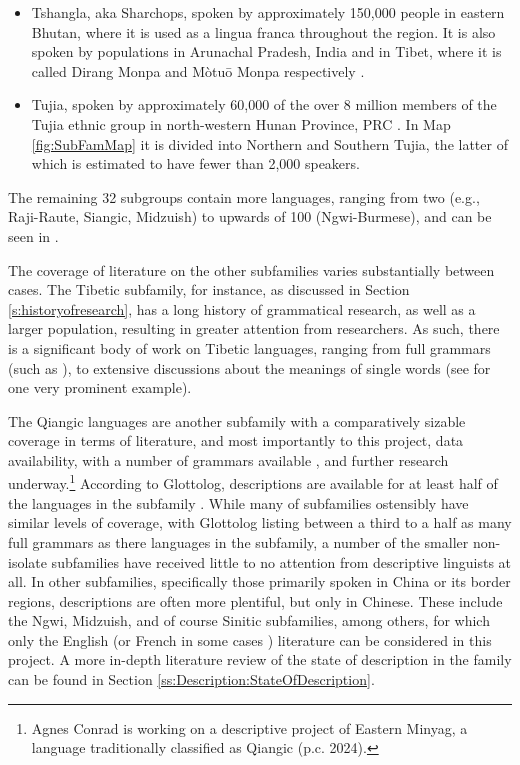 \begin{itemize}
    \item Tshangla, aka Sharchops, spoken by approximately 150,000 people in eastern Bhutan, where it is used as a lingua franca throughout the region. It is also spoken by populations in Arunachal Pradesh, India and in Tibet, where it is called Dirang Monpa and Mòtuō Monpa respectively \cites{Andvik2010}{Grollmann2018}.
    \item Tujia, spoken by approximately 60,000 of the over 8 million members of the Tujia ethnic group in north-western Hunan Province, PRC \cite{Brassett2006}. In Map \ref{fig:SubFamMap} it is divided into Northern and Southern Tujia, the latter of which is estimated to have fewer than 2,000 speakers.
\end{itemize}

The remaining 32 subgroups contain more languages, ranging from two (e.g., Raji-Raute, Siangic, Midzuish) to upwards of 100 (Ngwi-Burmese), and can be seen in .

The coverage of literature on the other subfamilies varies substantially between cases. The Tibetic subfamily, for instance, as discussed in Section \ref{s:historyofresearch}, has a long history of grammatical research, as well as a larger population, resulting in greater attention from researchers. As such, there is a significant body of work on Tibetic languages, ranging from full grammars (such as ), to extensive discussions about the meanings of single words (see  for one very prominent example).

The Qiangic languages are another subfamily with a comparatively sizable coverage in terms of literature, and most importantly to this project, data availability, with a number of grammars available \cites{LaPolla2003}{Ding2014}, and further research underway.\footnote{Agnes Conrad is working on a descriptive project of Eastern Minyag, a language traditionally classified as Qiangic (p.c. 2024).} According to Glottolog, descriptions are available for at least half of the languages in the subfamily \cite{glottolog}. While many of subfamilies ostensibly have similar levels of coverage, with Glottolog listing between a third to a half as many full grammars as there languages in the subfamily, a number of the smaller non-isolate subfamilies have received little to no attention from descriptive linguists at all. In other subfamilies, specifically those primarily spoken in China or its border regions, descriptions are often more plentiful, but only in Chinese. These include the Ngwi, Midzuish, and of course Sinitic subfamilies, among others, for which only the English (or French in some cases \cite{Lai2017}) literature can be considered in this project. A more in-depth literature review of the state of description in the family can be found in Section \ref{ss:Description:StateOfDescription}.

